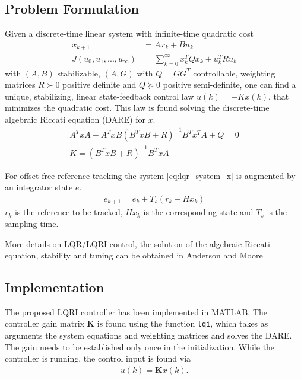 \subsection{Problem Formulation}
Given a discrete-time linear system with infinite-time quadratic cost
\begin{align}
x_{k+1} &= Ax_k + Bu_k \label{eq:lqr_system_x}\\
J(u_0,u_1,...,u_\infty) &= \sum_{k=0}^\infty  x_k^TQx_k + u_k^TRu_k \label{eq:lqr_system_J}
\end{align} 
with $(A,B)$ stabilizable, $(A,G)$ with $Q= G G^T$ controllable, weighting matrices $R\succ0$ positive definite and $Q\succeq0$ positive semi-definite, one can find a unique, stabilizing, linear state-feedback control law $u(k) = -{K} x(k)$, that minimizes the quadratic cost.
This law is found solving the discrete-time algebraic Riccati equation (DARE) for $x$.
\begin{align}
{A}^Tx{A}  - {A}^T x {B} \left( {B}^T x {B} + {R} \right)^{-1} {B}^T x^T {A} + {Q} = 0 \\
{K} = \left( {B}^T x {B} + {R} \right)^{-1} {B}^T x {A}
\end{align}

For offset-free reference tracking the system \ref{eq:lqr_system_x} is augmented by an integrator state $e$.
\begin{align}
e_{k+1} = e_k + {T_s} \left( r_k - {H}x_k \right) \label{eq:lqr_system_e}
\end{align}
$r_k$ is the reference to be tracked, ${H}x_k$ is the corresponding state and $T_s$ is the sampling time.

More details on LQR/LQRI control, the solution of the algebraic Riccati equation, stability and tuning can be obtained in Anderson and Moore \cite{Anderson2007}.

\subsection{Implementation}
The proposed LQRI controller has been implemented in MATLAB. The controller gain matrix $\mathbf{K}$ is found using the function \texttt{lqi}, which takes as arguments the system equations and weighting matrices and solves the DARE. The gain needs to be established only once in the initialization. While the controller is running, the control input is found via
\begin{align}
u(k) = \mathbf{K} x(k).
\end{align}

